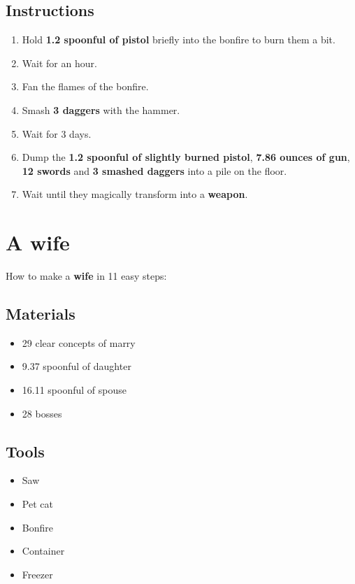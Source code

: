\documentclass{article}
\begin{document}
\subsection{Instructions}\begin{enumerate}
\item 
Hold \textbf{1.2 spoonful of pistol} briefly into the bonfire to burn them a bit.
\item 
Wait for an hour.
\item 
Fan the flames of the bonfire.
\item 
Smash \textbf{3 daggers} with the hammer.
\item 
Wait for 3 days.
\item 
Dump the \textbf{1.2 spoonful of slightly burned pistol}, \textbf{7.86 ounces of gun}, \textbf{12 swords} and \textbf{3 smashed daggers} into a pile on the floor.
\item 
Wait until they magically transform into a \textbf{weapon}.
\end{enumerate}
\newpage
\section{A wife}How to make a \textbf{wife} in 11 easy steps:

\subsection{Materials}\begin{itemize}
\item 
29 clear concepts of marry
\item 
9.37 spoonful of daughter
\item 
16.11 spoonful of spouse
\item 
28 bosses
\end{itemize}
\subsection{Tools}\begin{itemize}
\item 
Saw
\item 
Pet cat
\item 
Bonfire
\item 
Container
\item 
Freezer
\end{itemize}
\end{document}

